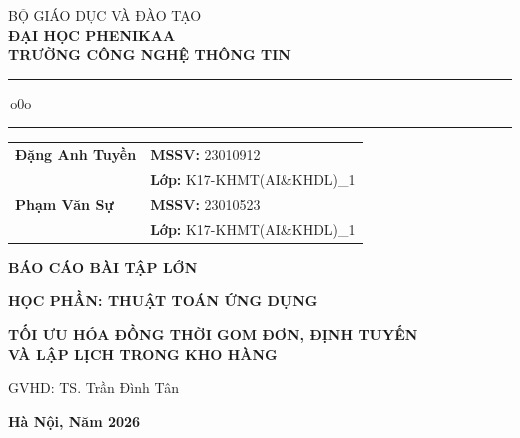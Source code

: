 \documentclass[12pt,a4paper]{article}
\theoremstyle{plain} %
\theoremstyle{plain} %
\theoremstyle{plain} %
\theoremstyle{nonumberplain}  %
\numberwithin{equation}{section}
\numberwithin{figure}{section}
\numberwithin{table}{section}
\begin{document}
\begin{titlepage}
\thispagestyle{empty}
\thisfancypage{\setlength{\fboxsep}{0.2cm}\setlength{\fboxrule}{1pt}\doublebox}{}
\begin{center}
	\large
	BỘ GIÁO DỤC VÀ ĐÀO TẠO\\
	\textbf{ĐẠI HỌC PHENIKAA}\\
	\textbf{TRƯỜNG CÔNG NGHỆ THÔNG TIN}\\[0.15cm]
	\rule{4cm}{0.4pt}\,o0o\,\rule{4cm}{0.4pt}
\end{center}
\vspace{1.5cm}
\begin{center}
	\normalsize
	\renewcommand{\arraystretch}{1.15}
	\begin{tabular}{@{}p{5.2cm}l@{}}
        \textbf{Đặng Anh Tuyền} & \textbf{MSSV:} 23010912 \\
                                & \textbf{Lớp:} K17-KHMT(AI\&KHDL)\_1 \\[0.25cm]
        \textbf{Phạm Văn Sự} & \textbf{MSSV:} 23010523 \\
                                & \textbf{Lớp:} K17-KHMT(AI\&KHDL)\_1
	\end{tabular}
\end{center}
\vspace{1.3cm}
\begin{center}
    \bf\Large {BÁO CÁO BÀI TẬP LỚN}
\end{center}
\begin{center}
    \bf\large {HỌC PHẦN: THUẬT TOÁN ỨNG DỤNG}
\end{center}
\vspace{0.65cm}
\begin{center}
	\bf\Large TỐI ƯU HÓA ĐỒNG THỜI GOM ĐƠN, ĐỊNH TUYẾN\\
    VÀ LẬP LỊCH TRONG KHO HÀNG
\end{center}
\vfill
\begin{center}
    GVHD: TS. Trần Đình Tân
\end{center}
\vfill
\begin{center}
    {\large\textbf{Hà Nội, Năm 2026}}
\end{center}
\vspace{0.25cm}
\end{titlepage}
\end{document}

